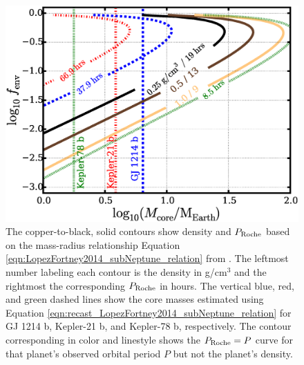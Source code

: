 \documentclass{svjour3}                     %
\begin{document}
\begin{figure}
\includegraphics[width=\textwidth]{LopezFortney2014_density-PRoche_contours}
\caption{The copper-to-black, solid contours show density and $P_{\rm Roche}$ based on the mass-radius relationship Equation \ref{eqn:LopezFortney2014_subNeptune_relation} from \cite{Lopez2014Understanding}. The leftmost number labeling each contour is the density in g/cm$^3$ and the rightmost the corresponding $P_{\rm Roche}$ in hours. The vertical blue, red, and green dashed lines show the core masses estimated using Equation \ref{eqn:recast_LopezFortney2014_subNeptune_relation} for GJ 1214 b, Kepler-21 b, and Kepler-78 b, respectively. The contour corresponding in color and linestyle shows the $P_{\rm Roche} = P$ curve for that planet's observed orbital period $P$ but not the planet's density.}
\label{fig:LopezFortney2014_density-PRoche_contours}
\end{figure}
\end{document}
